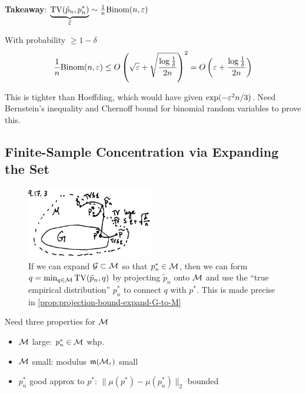 \textbf{Takeaway}:
$\underbrace{\operatorname{TV}(\tilde{p}_n, p_n^*)}_{\tilde{\varepsilon}} \sim \frac{1}{n}\text{Binom}(n, \varepsilon)$

\begin{lemma}
  With probability $\geq 1 - \delta$
  \begin{align}
    \frac{1}{n} \text{Binom}(n, \varepsilon)
    \leq O\left(\sqrt{\varepsilon} + \sqrt{\frac{\log \frac{1}{\delta}}{2 n}}\right)^2
    = O\left(\varepsilon + \frac{\log \frac{1}{\delta}}{2 n}\right)
  \end{align}
\end{lemma}

\begin{remark}
  This is tighter than Hoeffding, which would have given $\exp(-\varepsilon^2 n / 3)$.
  Need Bernstein's inequality and Chernoff bound for binomial random variables
  to prove this.
\end{remark}

\subsection{Finite-Sample Concentration via Expanding the Set}%

\begin{figure}[H]
  \begin{center}
    \includegraphics[width=0.5\textwidth]{figures/9-17-3.png}
    \caption{If we can expand $\mathcal{G} \subset \mathcal{M}$ so that $p_n^* \in \mathcal{M}$,
      then we can form $q = \min_{q \in \mathcal{M}} \operatorname{TV}(\tilde{p}_n, q)$ by projecting
      $\tilde{p}_n$ onto $\mathcal{M}$ and use the ``true empirical distribution'' $p_n^*$
      to connect $q$ with $p^*$. This is made precise in \cref{prop:projection-bound-expand-G-to-M}}
  \end{center}
\end{figure}

Need three properties for $\mathcal{M}$
\begin{itemize}
  \item $\mathcal{M}$ large: $p_n^* \in \mathcal{M}$ whp.
  \item $\mathcal{M}$ small: modulus $\mathfrak{m}(\mathcal{M}_{\varepsilon})$ small
  \item $p_n^*$ good approx to $p^*$: $\|\mu(p^*) - \mu(p_n^*)\|_2$ bounded
\end{itemize}

